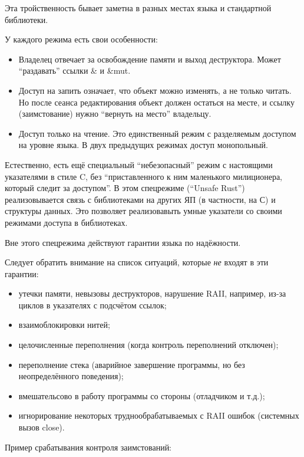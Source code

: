 \documentclass[10pt, a5paper]{article}
\begin{document}
Эта тройственность бывает заметна в разных местах языка и стандартной библиотеки.

У каждого режима есть свои особенности:

\begin{itemize}
  \item Владелец отвечает за освобождение памяти и выход деструктора. Может ``раздавать'' ссылки \& и \&mut.
  \item Доступ на запить означает, что объект можно изменять, а не только читать. Но после сеанса редактирования объект должен остаться на месте, и ссылку (заимстование) нужно ``вернуть на место'' владельцу.
  \item Доступ только на чтение. Это единственный режим с разделяемым доступом на уровне языка. В двух предыдущих режимах доступ монопольный.
\end{itemize}

Естественно, есть ещё специальный ``небезопасный'' режим с настоящими указателями в стиле C, без ``приставленного к ним маленького милиционера, который следит за доступом''. В этом спецрежиме (``Unsafe Rust'') реализовывается связь с библиотеками на других ЯП (в частности, на С) и структуры данных. Это позволяет реализовавыть умные указатели со своими режимами доступа в библиотеках.

Вне этого спецрежима действуют гарантии языка по надёжности.

Следует обратить внимание на список ситуаций, которые \emph{не} входят в эти гарантии:

\begin{itemize}
  \item утечки памяти, невызовы деструкторов, нарушение RAII, например, из-за циклов в указателях с подсчётом ссылок;
  \item взаимоблокировки нитей;
  \item целочисленные переполнения (когда контроль переполнений отключен);
  \item переполнение стека (аварийное завершение программы, но без неопределённого поведения);
  \item вмешательсово в работу программы со стороны (отладчиком и т.д.);
  \item игнорирование некоторых труднообрабатываемых с RAII ошибок (системных вызов close).
\end{itemize}

Пример срабатывания контроля заимстований:
\end{document}
